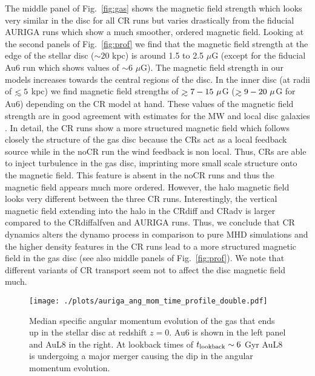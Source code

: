 \documentclass[useAMS,usenatbib]{mnras}
\def\lesssim{\mathrel{\hbox{\rlap{\hbox{\lower4pt\hbox{$\sim$}}}\hbox{$<$}}}}
\def\gtrsim{\mathrel{\hbox{\rlap{\hbox{\lower4pt\hbox{$\sim$}}}\hbox{$>$}}}}
\begin{document}
The middle panel of Fig.\ \ref{fig:gas} shows the magnetic field strength which looks very similar in the disc for all CR runs but varies drastically from the fiducial AURIGA runs which show a much smoother, ordered magnetic field. Looking at the second panels of Fig.\ \ref{fig:prof} we find that the magnetic field strength at the edge of the stellar disc ($\sim20$ kpc) is around 1.5 to 2.5 $\mu$G (except for the fiducial Au6 run which shows values of $\sim6$ $\mu$G). The magnetic field strength in our models increases towards the central regions of the disc. In the inner disc (at radii of $\lesssim5$ kpc) we find magnetic field strengths of $\gtrsim7-15~\mu$G ($\gtrsim9-20~\mu$G for Au6) depending on the CR model at hand.
These values of the magnetic field strength are in good agreement with estimates for the MW \citep{Haverkorn2006,Haverkorn2015,Sun2012,Pakmor2018} and local disc galaxies \citep{Beck2019}. In detail, the CR runs show a more structured magnetic field which follows closely the structure of the gas disc because the CRs act as a local feedback source while in the noCR run the wind feedback is non local. Thus, CRs are able to inject turbulence in the gas disc, imprinting more small scale structure onto the magnetic field. This feature is absent in the noCR runs and thus the magnetic field appears much more ordered. However, the halo magnetic field looks very different between the three CR runs. Interestingly, the vertical magnetic field extending into the halo in the CRdiff and CRadv is larger compared to the CRdiffalfven and AURIGA runs. Thus, we conclude that CR dynamics alters the dynamo process in comparison to pure MHD simulations and the higher density features in the CR runs lead to a more structured magnetic field in the gas disc (see also middle panels of Fig.\ \ref{fig:prof}). We note that different variants of CR transport seem not to affect the disc magnetic field much.


\begin{figure}
\vspace*{-.5cm}
\hspace*{-.5cm}
\texttt{[image: ./plots/auriga\_ang\_mom\_time\_profile\_double.pdf]}
\vspace{-.75cm}
\caption{Median specific angular momentum evolution of the gas that ends up in the stellar disc at redshift $z=0$. Au6 is shown in the left panel and AuL8 in the right. At lookback times of $t_{\rm lookback}\sim6$ Gyr AuL8 is undergoing a major merger causing the dip in the angular momentum evolution.}
\label{fig:ang_mom}
\end{figure}
\end{document}
